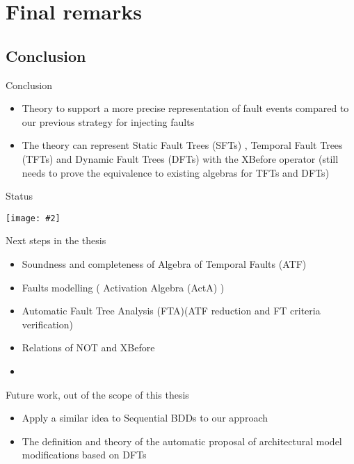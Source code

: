 \documentclass{beamer}
\def\FTA{Fault Tree Analysis (FTA)\gdef\FTA{FTA\xspace}\xspace}
\def\SFT{%
	Static Fault Tree (SFT)%
	\gdef\SFT{SFT\xspace}%
	\gdef\SFTs{SFTs\xspace}%
	\xspace%
}
\def\SFTs{%
	Static Fault Trees (SFTs)%
	\gdef\SFT{SFT\xspace}%
	\gdef\SFTs{SFTs\xspace}%
	\xspace%
}
\def\TFT{%
	Temporal Fault Tree (TFT)%
	\gdef\TFT{TFT\xspace}%
	\gdef\TFTs{TFTs\xspace}%
	\xspace%
}
\def\TFTs{%
	Temporal Fault Trees (TFTs)%
	\gdef\TFT{TFT\xspace}%
	\gdef\TFTs{TFTs\xspace}%
	\xspace%
}
\def\DFT{%
	Dynamic Fault Tree (DFT)%
	\gdef\DFT{DFT\xspace}%
	\gdef\DFTs{DFTs\xspace}%
	\xspace%
}
\def\DFTs{%
	Dynamic Fault Trees (DFTs)%
	\gdef\DFT{DFT\xspace}%
	\gdef\DFTs{DFTs\xspace}%
	\xspace%
}
\def\ATF{%
	Algebra of Temporal Faults (ATF)%
	\gdef\ATF{ATF\xspace}%
	\gdef\iATF{an ATF\xspace}%
	\gdef\IATF{An ATF\xspace}%
	\xspace%
}
\def\iATF{%
	an Algebra of Temporal Faults (ATF)%
	\gdef\ATF{ATF\xspace}%
	\gdef\iATF{an ATF\xspace}%
	\gdef\IATF{An ATF\xspace}%
	\xspace%
}
\def\IATF{%
	An Algebra of Temporal Faults (ATF)%
	\gdef\ATF{ATF\xspace}%
	\gdef\iATF{an ATF\xspace}%
	\gdef\IATF{An ATF\xspace}%
	\xspace%
}
\def\activation{%
	Activation Algebra (ActA)%
	\gdef\activation{ActA\xspace}%
	\xspace%
}
\newcommand{\includegraphicsaspectratio}[2][1]{%
  \texttt{[image: \#2]}%
}
\begin{document}
\section{Final remarks}
\subsection{Conclusion}

\begin{frame}{Conclusion}
	\begin{itemize}
		\item Theory to support a more precise representation of fault events compared to our previous strategy for injecting faults
		\item The theory can represent \SFTs, \TFTs and \DFTs with the XBefore operator (still needs to prove the equivalence to existing algebras for \TFTs and \DFTs)
	\end{itemize}
\end{frame}

\begin{frame}{Status}
	\begin{center}
		\includegraphicsaspectratio[0.8]{StrategyOverview-Status}
	\end{center}
\end{frame}

\begin{frame}[label=nextsteps]{Next steps in the thesis}
	\begin{itemize}
		\item Soundness and completeness of \ATF
		\item Faults modelling (\activation) 
		\item Automatic \FTA (\ATF reduction and FT criteria verification)
		\item Relations of NOT and XBefore
		\item \hyperlink{tasks}{}
	\end{itemize}
\end{frame}

\begin{frame}{Future work, out of the scope of this thesis}
	\begin{itemize}
		\item Apply a similar idea to Sequential BDDs to our approach
		\item The definition and theory of the automatic proposal of architectural model modifications based on \DFTs
	\end{itemize}
\end{frame}
\end{document}
